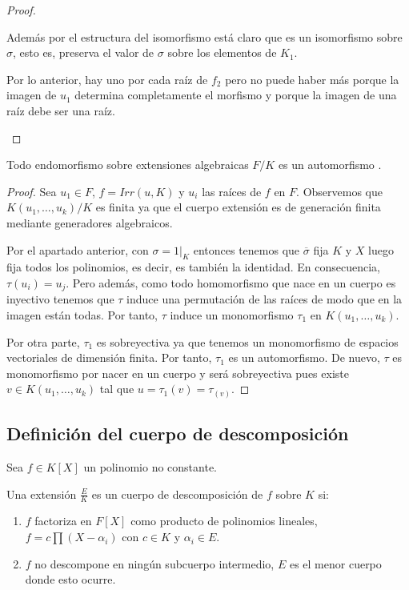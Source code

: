 \begin{proof}
\begin{enumerate}
		Además por el estructura del isomorfismo está claro que es un isomorfismo sobre $\sigma$, esto es, preserva el valor de $\sigma$ sobre los elementos de $K_1$. 
		
		Por lo anterior, hay uno por cada raíz de $f_2$ pero no puede haber más porque la imagen de $u_1$ determina completamente el morfismo y porque la imagen de una raíz debe ser una raíz. 
	\end{enumerate}
\end{proof}

\begin{corollary}
	Todo endomorfismo sobre extensiones algebraicas $F/K$ es un automorfismo . 
\end{corollary}
\begin{proof}
	Sea $u_1 \in F$, $f = Irr(u,K)$ y $u_i$ las raíces de $f$ en $F$. Observemos que $K(u_1,\ldots,u_k)/K$ es finita ya que el cuerpo extensión es de generación finita mediante generadores algebraicos. 
	
	Por el apartado anterior, con $\sigma = 1|_K$  entonces tenemos que $\overline{\sigma}$ fija $K$ y $X$ luego fija todos los polinomios, es decir, es también la identidad. En consecuencia, $\tau(u_i) = u_j$. Pero además, como todo homomorfismo que nace en un cuerpo es inyectivo tenemos que $\tau$ induce una permutación de las raíces de modo que en la imagen están todas. Por tanto, $\tau$ induce un monomorfismo $\tau_1$ en $K(u_1,\ldots,u_k)$.
	
	Por otra parte, $\tau_1$ es sobreyectiva ya que tenemos un monomorfismo de espacios vectoriales de dimensión finita. Por tanto, $\tau_1$ es un automorfismo. De nuevo, $\tau$ es monomorfismo por nacer en un cuerpo y será sobreyectiva pues existe $v \in K(u_1,\ldots,u_k)$ tal que $u = \tau_1(v) = \tau_(v)$. 
\end{proof}

\subsection{Definición del cuerpo de descomposición}

\begin{definition}
Sea $f \in K[X]$ un polinomio no constante. 

Una extensión $\frac{E}{K}$ es un cuerpo de descomposición de $f$ sobre $K$ si:

\begin{enumerate}
	\item $f$ factoriza en $F[X]$ como producto de polinomios lineales, $f = c \prod (X - \alpha_i)$ con $c \in K$ y $\alpha_i \in E$.
	\item $f$ no descompone en ningún subcuerpo intermedio, $E$ es el menor cuerpo donde esto ocurre. 
\end{enumerate}  
\end{definition}

